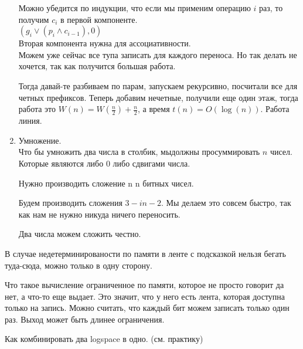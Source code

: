 \begin{exmp}
\begin{enumerate}
Можно убедится по индукции, что если мы применим операцию $i$ раз, то получим $c_i$ в первой компоненте.\\
$(g_i \vee (p_i \wedge c_{i - 1}), 0)$\\
Вторая компонента нужна для ассоциативности.\\

Можем уже сейчас все тупа записать для каждого переноса. Но так делать не хочется, 
так как получится большая работа. 

Тогда давай-те разбиваем по парам, запускаем рекурсивно, посчитали все для 
четных префиксов. Теперь добавим нечетные, получили еще один этаж, тогда
работа это $W(n) = W(\frac{n}{2}) + \frac{n}{2}$, а время $t(n) = O(\log (n))$. 
Работа линия.

\item Умножение.\\ 
Что бы умножить два числа в столбик, мыдолжны просуммировать $n$ чисел. Которые
являются либо 0 либо сдвигами числа. 

Нужно производить сложение n n битных чисел. 

Будем производить сложения $3-in-2$.
Мы делаем это совсем быстро, так как нам не нужно никуда ничего переносить.

Два числа можем сложить честно.
\end{enumerate}
\end{exmp}
\begin{Rem}
В случае недетерминированости по памяти
в ленте с подсказкой нельзя бегать туда-сюда, можно только в одну сторону.
\end{Rem}
\begin{Rem}
Что такое вычисление ограниченное по памяти, которое не просто 
говорит да нет, а что-то еще выдает. Это значит, что у него 
есть лента, которая доступна только на запись. Можно считать, 
что каждый бит можем записать только один раз. Выход может быть длинее
ограничения. 
\end{Rem}
Как комбинировать два logspace в одно. (см. практику) 

